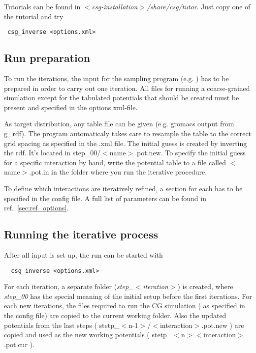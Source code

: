 Tutorials can be found in \textit{$<$csg-installation$>$/share/csg/tutor}. Just copy one of the tutorial and try
\begin{verbatim}
 csg_inverse <options.xml>
\end{verbatim}

\subsection{Run preparation}
To run the iterations, the input for the sampling program (e.g. \gromacs ) has to be prepared in order to carry out one iteration. All files for running a coarse-grained simulation except for the tabulated potentials that should be created must be present and specified in the options xml-file.

As target distribution, any table file can be given (e.g. gromacs output from g\_rdf). The program automaticaly takes care to resample the table to the correct grid spacing as specified in the .xml file.
The initial guess is created by inverting the rdf. It's located in step\_00/$<$name$>$.pot.new. To specify the initial guess for a specific interaction by hand, write the potential table to a file called $<$name$>$.pot.in in the folder where you run the iterative procedure.

To define which interactions are iteratively refined, a section for each has to be specified in the config file. A full list of parameters can be found in ref.~\ref{sec:ref_options}.

\subsection{Running the iterative process}
After all input is set up, the run can be started with
\begin{verbatim}
  csg_inverse <options.xml>
\end{verbatim}

For each iteration, a separate folder (\textit{step\_$<$iteration$>$}) is created, where \textit{step\_00} has the special meaning of the initial setup before the first iterations. For each new iterations, the files required to run the CG simulation ( as specified in the config file) are copied to the current working folder. Also the updated potentials from the last steps ( stetp\_$<$n-1$>$/$<$interaction$>$.pot.new ) are copied and used as the new working potentials ( stetp\_$<$n$>$\/$<$interaction$>$.pot.cur ).

